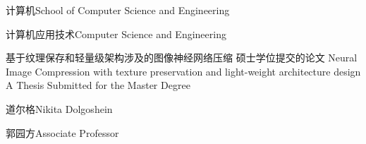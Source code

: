 
\school
{计算机}{School of Computer Science and Engineering}

\major
{计算机应用技术}{Computer Science and Engineering}

\thesistitle
{基于纹理保存和轻量级架构涉及的图像神经网络压缩}
{硕士学位提交的论文}
{Neural Image Compression with texture preservation and light-weight architecture design}
{A Thesis Submitted for the Master Degree}

\thesisauthor
{道尔格}{Nikita Dolgoshein}

\teacher
{郭园方}{Associate Professor}



\thesisend{\ \ \ \ \ \ \ \ }{\ \ \ \ }{\ \ \ \ }



